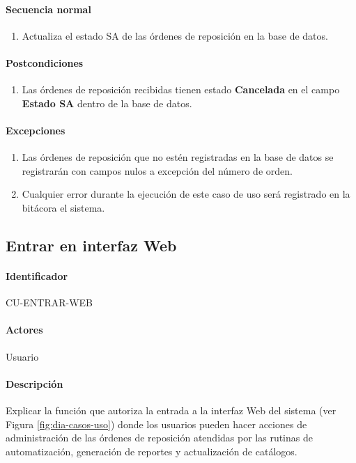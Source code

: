 \paragraph*{Secuencia normal}
\begin{enumerate}
  \item Actualiza el estado SA de las órdenes de reposición en la base de datos.
\end{enumerate}
\paragraph*{Postcondiciones}
\begin{enumerate}
  \item Las órdenes de reposición recibidas tienen estado \textbf{Cancelada} en el campo \textbf{Estado SA} dentro de la base de datos.
\end{enumerate}
\paragraph*{Excepciones}
\begin{enumerate}
  \item Las órdenes de reposición que no estén registradas en la base de datos se registrarán con campos nulos a excepción del número de orden.
  \item Cualquier error durante la ejecución de este caso de uso será registrado en la bitácora el sistema.
\end{enumerate}


\subsection{Entrar en interfaz Web}
\paragraph*{Identificador}
CU-ENTRAR-WEB
\paragraph*{Actores}
Usuario
\paragraph*{Descripción}
Explicar la función que autoriza la entrada a la interfaz Web del sistema (ver Figura \ref{fig:dia-casos-uso}) donde los usuarios pueden hacer acciones de administración de las órdenes de reposición atendidas por las rutinas de automatización, generación de reportes y actualización de catálogos.
